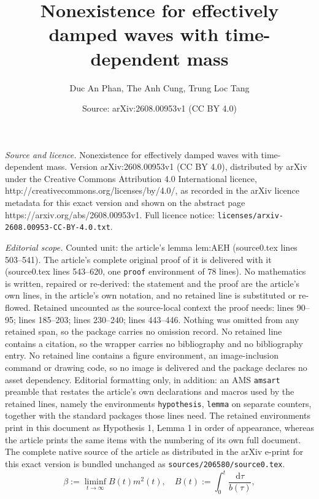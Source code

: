 \documentclass[10pt,a4paper]{amsart}
\title{Nonexistence for effectively damped waves with time-dependent mass}
\author{Duc An Phan, The Anh Cung, Trung Loc Tang}
\date{Source: arXiv:2608.00953v1 (CC BY 4.0)}
\begin{document}
\maketitle

\noindent\emph{Source and licence.} Nonexistence for effectively damped waves with time-dependent mass. Version arXiv:2608.00953v1 (CC BY 4.0), distributed by arXiv under the Creative Commons Attribution 4.0 International licence, http://creativecommons.org/licenses/by/4.0/, as recorded in the arXiv licence metadata for this exact version and shown on the abstract page https://arxiv.org/abs/2608.00953v1. Full licence notice: \texttt{licenses/arxiv-2608.00953-CC-BY-4.0.txt}.\par\smallskip

\noindent\textit{Editorial scope.} Counted unit: the article's lemma lem:AEH (source0.tex lines 503--541). The article's complete original proof of it is delivered with it (source0.tex lines 543--620, one \texttt{proof} environment of 78 lines). No mathematics is written, repaired or re-derived: the statement and the proof are the article's own lines, in the article's own notation, and no retained line is substituted or re-flowed.  Retained uncounted as the source-local context the proof needs: lines 90--95; lines 185--203; lines 230--240; lines 443--446.  Nothing was omitted from any retained span, so the package carries no omission record.  No retained line contains a citation, so the wrapper carries no bibliography and no bibliography entry.  No retained line contains a figure environment, an image-inclusion command or drawing code, so no image is delivered and the package declares no asset dependency.  Editorial formatting only, in addition: an AMS \texttt{amsart} preamble that restates the article's own declarations and macros used by the retained lines, namely the environments \texttt{hypothesis}, \texttt{lemma} on separate counters, together with the standard packages those lines need.  The retained environments print in this document as Hypothesis 1, Lemma 1 in order of appearance, whereas the article prints the same items with the numbering of its own full document.  The complete native source of the article as distributed in the arXiv e-print for this exact version is bundled unchanged as \texttt{sources/206580/source0.tex}.
	\begin{equation}
		\label{eq:beta}
		\beta:=\liminf_{t\to\infty}B(t)m^2(t),
		\quad
		B(t):=\int_0^t\frac{\mathrm{d}\tau}{b(\tau)},
	\end{equation}
\end{document}
